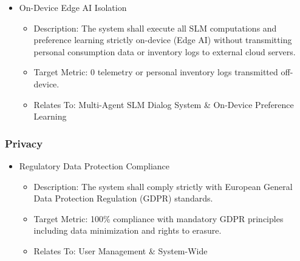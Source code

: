 \documentclass[conference]{IEEEtran}
\begin{document}
\begin{itemize}
    \item On-Device Edge AI Isolation
    \begin{itemize}
        \item Description: The system shall execute all SLM computations and preference learning strictly on-device (Edge AI) without transmitting personal consumption data or inventory logs to external cloud servers.
        \item Target Metric: 0 telemetry or personal inventory logs transmitted off-device.
        \item Relates To: Multi-Agent SLM Dialog System \& On-Device Preference Learning
    \end{itemize}
\end{itemize}

\subsubsection{Privacy}
\begin{itemize}
    \item Regulatory Data Protection Compliance
    \begin{itemize}
        \item Description: The system shall comply strictly with European General Data Protection Regulation (GDPR) standards.
        \item Target Metric: 100\% compliance with mandatory GDPR principles including data minimization and rights to erasure.
        \item Relates To: User Management \& System-Wide
    \end{itemize}
\end{itemize}
\end{document}
